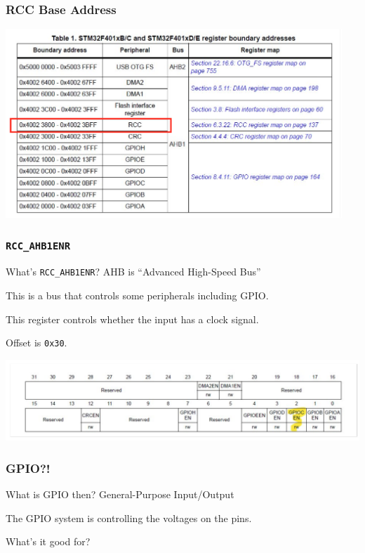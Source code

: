 \begin{frame}
\frametitle{RCC Base Address}

\begin{center}
	\includegraphics[width=0.95\textwidth]{images/rcc-base.png}
\end{center}


\end{frame}


\begin{frame}
\frametitle{\texttt{RCC\_AHB1ENR}}

What's \texttt{RCC\_AHB1ENR}? AHB is ``Advanced High-Speed Bus''

This is a bus that controls some peripherals including GPIO.

This register controls whether the input has a clock signal. 

Offset is \texttt{0x30}.

\begin{center}
	\includegraphics[width=\textwidth]{images/rcc-ahb.png}
\end{center}

\end{frame}


\begin{frame}
\frametitle{GPIO?!}

What is GPIO then? General-Purpose Input/Output

The GPIO system is controlling the voltages on the pins.
 
What's it good for?

\end{frame}


